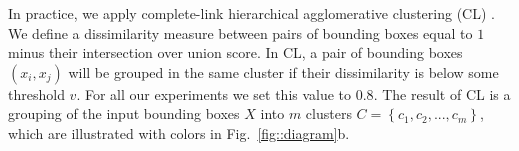 


In practice,
we apply complete-link hierarchical agglomerative clustering (CL)
\cite{Jain88}.
We define a dissimilarity measure between pairs of bounding boxes equal to
$1$ minus their intersection over union score.
In CL, a pair of bounding boxes $(x_i, x_j)$ will be grouped in the same cluster
if their dissimilarity is below some threshold $v$.
For all our experiments we set this value to $0.8$.
The result of CL is a grouping of the input bounding boxes $X$ into 
$m$ clusters $C = \left \{ c_1, c_2, ..., c_m \right \}$,
which are illustrated with colors in Fig.~\ref{fig::diagram}b.

